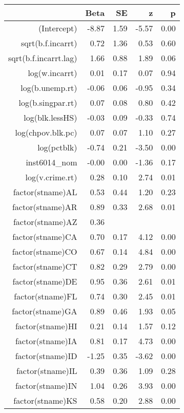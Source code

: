 \begin{table}[ht]
\centering
\begin{tabular}{rrrrr}
  \hline
 & Beta & SE & z & p \\ 
  \hline
(Intercept) & -8.87 & 1.59 & -5.57 & 0.00 \\ 
  sqrt(b.f.incarrt) & 0.72 & 1.36 & 0.53 & 0.60 \\ 
  sqrt(b.f.incarrt.lag) & 1.66 & 0.88 & 1.89 & 0.06 \\ 
  log(w.incarrt) & 0.01 & 0.17 & 0.07 & 0.94 \\ 
  log(b.unemp.rt) & -0.06 & 0.06 & -0.95 & 0.34 \\ 
  log(b.singpar.rt) & 0.07 & 0.08 & 0.80 & 0.42 \\ 
  log(blk.lessHS) & -0.03 & 0.09 & -0.33 & 0.74 \\ 
  log(chpov.blk.pc) & 0.07 & 0.07 & 1.10 & 0.27 \\ 
  log(pctblk) & -0.74 & 0.21 & -3.50 & 0.00 \\ 
  inst6014\_nom & -0.00 & 0.00 & -1.36 & 0.17 \\ 
  log(v.crime.rt) & 0.28 & 0.10 & 2.74 & 0.01 \\ 
  factor(stname)AL & 0.53 & 0.44 & 1.20 & 0.23 \\ 
  factor(stname)AR & 0.89 & 0.33 & 2.68 & 0.01 \\ 
  factor(stname)AZ & 0.36 &  &  &  \\ 
  factor(stname)CA & 0.70 & 0.17 & 4.12 & 0.00 \\ 
  factor(stname)CO & 0.67 & 0.14 & 4.84 & 0.00 \\ 
  factor(stname)CT & 0.82 & 0.29 & 2.79 & 0.00 \\ 
  factor(stname)DE & 0.95 & 0.36 & 2.61 & 0.01 \\ 
  factor(stname)FL & 0.74 & 0.30 & 2.45 & 0.01 \\ 
  factor(stname)GA & 0.89 & 0.46 & 1.93 & 0.05 \\ 
  factor(stname)HI & 0.21 & 0.14 & 1.57 & 0.12 \\ 
  factor(stname)IA & 0.81 & 0.17 & 4.73 & 0.00 \\ 
  factor(stname)ID & -1.25 & 0.35 & -3.62 & 0.00 \\ 
  factor(stname)IL & 0.39 & 0.36 & 1.09 & 0.28 \\ 
  factor(stname)IN & 1.04 & 0.26 & 3.93 & 0.00 \\ 
  factor(stname)KS & 0.58 & 0.20 & 2.88 & 0.00 \\ 

\end{tabular}
\end{table}
